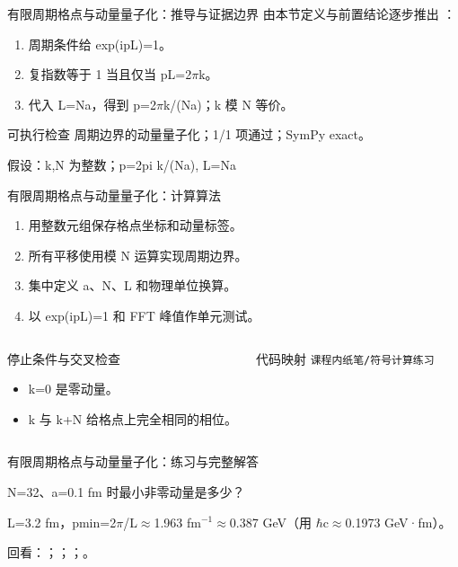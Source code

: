 \begin{frame}[t]{有限周期格点与动量量子化：推导与证据边界}
\footnotesize
{}\quad 由本节定义与前置结论逐步推出 ：
\begin{enumerate}
\item 周期条件给 exp(ipL)=1。
\item 复指数等于 1 当且仅当 pL=2\ensuremath{\pi}k。
\item 代入 L=Na，得到 p=2\ensuremath{\pi}k/\allowbreak{}(Na)；k 模 N 等价。
\end{enumerate}\begin{block}{可执行检查}
\quad 周期边界的动量量子化；1/1 项通过；SymPy exact。
\par\scriptsize 假设：k,N 为整数；p=2pi k/\allowbreak{}(Na), L=Na
\end{block}
\end{frame}

\begin{frame}[t]{有限周期格点与动量量子化：计算算法}
\footnotesize
{}\begin{enumerate}
\item 用整数元组保存格点坐标和动量标签。
\item 所有平移使用模 N 运算实现周期边界。
\item 集中定义 a、N、L 和物理单位换算。
\item 以 exp(ipL)=1 和 FFT 峰值作单元测试。
\end{enumerate}\begin{columns}[T,onlytextwidth]
\begin{block}{停止条件与交叉检查}\scriptsize\begin{itemize}
\item[\CheckMark] k=0 是零动量。
\item[\CheckMark] k 与 k+N 给格点上完全相同的相位。
\end{itemize}\end{block}
\begin{block}{代码映射}
\scriptsize \texttt{课程内纸笔/\allowbreak{}符号计算练习}
\end{block}\end{columns}\end{frame}

\begin{frame}[t]{有限周期格点与动量量子化：练习与完整解答}
\footnotesize
\begin{block}{}N=32、a=0.1 fm 时最小非零动量是多少？\end{block}
\begin{exampleblock}{}L=3.2 fm，pmin=2\ensuremath{\pi}/\allowbreak{}L\ensuremath{\approx}1.963 fm\ensuremath{^{-1}}\ensuremath{\approx}0.387 GeV（用 \ensuremath{\hbar}c\ensuremath{\approx}0.1973 GeV·fm）。\end{exampleblock}
\vfill
\scriptsize 回看：；；；。
\end{frame}

